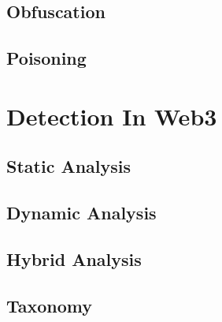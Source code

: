 \documentclass[11pt,fleqn,oneside]{book} %
\begin{document}
\chapter{Obfuscation} \label{ch:foreseen-obfuscation}


\chapter{Poisoning} \label{ch:foreseen-poisoning}




\part{Detection In Web3}
\chapter{Static Analysis} \label{ch:static-analysis}



\chapter{Dynamic Analysis} \label{ch:dynamic-analysis}



\chapter{Hybrid Analysis} \label{ch:hybrid-analysis}



\chapter{Taxonomy} \label{ch:taxonomy}


\end{document}
